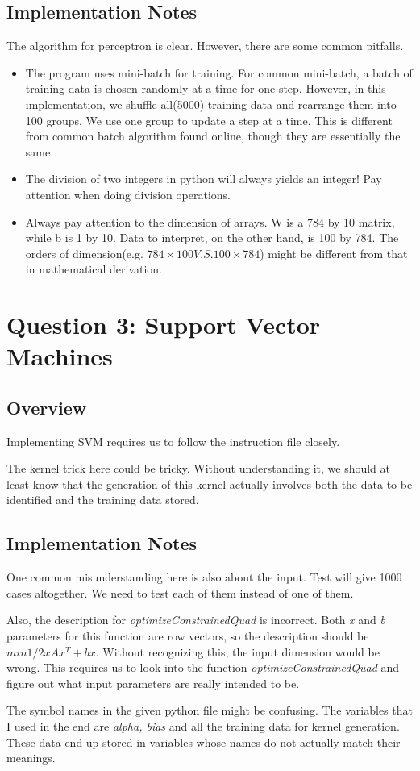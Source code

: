 \documentclass{article}
\begin{document}
\subsection{Implementation Notes}
The algorithm for perceptron is clear. However, there are some common pitfalls.
\begin{itemize}
  \item The program uses mini-batch for training. For common mini-batch, a batch of training data is chosen randomly at a time for one step. However, in this implementation, we shuffle all(5000) training data and rearrange them into 100 groups. We use one group to update a step at a time. This is different from common batch algorithm found online, though they are essentially the same.
  \item The division of two integers in python will always yields an integer! Pay attention when doing division operations.
  \item Always pay attention to the dimension of arrays. W is a 784 by 10 matrix, while b is 1 by 10. Data to interpret, on the other hand, is 100 by 784. The orders of dimension(e.g. $784 \times 100 V.S. 100 \times 784$) might be different from that in mathematical derivation.
\end{itemize}

\section{Question 3: Support Vector Machines}
\subsection{Overview}
Implementing SVM requires us to follow the instruction file closely.\par
The kernel trick here could be tricky. Without understanding it, we should at least know that the generation of this kernel actually involves both the data to be identified and the training data stored.
\subsection{Implementation Notes}
One common misunderstanding here is also about the input. Test will give 1000 cases altogether. We need to test each of them instead of one of them.\par
Also, the description for \textit{optimizeConstrainedQuad} is incorrect. Both \textit{x} and \textit{b} parameters for this function are row vectors, so the description should be $min 1/2 x A x^T + b x$. Without recognizing this, the input dimension would be wrong. This requires us to look into the function \textit{optimizeConstrainedQuad} and figure out what input parameters are really intended to be.\par
The symbol names in the given python file might be confusing. The variables that I used in the end are \textit{alpha, bias} and all the training data for kernel generation. These data end up stored in variables whose names do not actually match their meanings.
\end{document}
